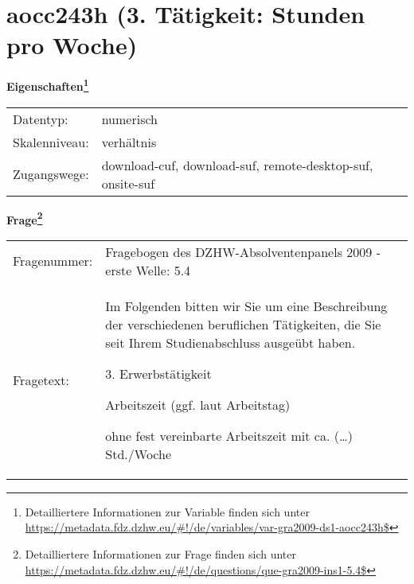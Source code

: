 
    \setcounter{footnote}{0}

    \vspace*{-1.8cm}
	\section{aocc243h (3. Tätigkeit: Stunden pro Woche)}
	\label{section:aocc243h}



    \vspace*{0.5cm}
    \noindent\textbf{Eigenschaften\footnote{Detailliertere Informationen zur Variable finden sich unter
		\url{https://metadata.fdz.dzhw.eu/\#!/de/variables/var-gra2009-ds1-aocc243h$}}}\\
	\begin{tabularx}{\hsize}{@{}lX}
	Datentyp: & numerisch \\
	Skalenniveau: & verhältnis \\
	Zugangswege: &
	  download-cuf, 
	  download-suf, 
	  remote-desktop-suf, 
	  onsite-suf
 \\
    \end{tabularx}



				\vspace*{0.5cm}
                \noindent\textbf{Frage\footnote{Detailliertere Informationen zur Frage finden sich unter
		              \url{https://metadata.fdz.dzhw.eu/\#!/de/questions/que-gra2009-ins1-5.4$}}}\\
				\begin{tabularx}{\hsize}{@{}lX}
					Fragenummer: &
					  Fragebogen des DZHW-Absolventenpanels 2009 - erste Welle:
					  5.4
 \\
					Fragetext: & Im Folgenden bitten wir Sie um eine Beschreibung der verschiedenen beruflichen Tätigkeiten, die Sie seit Ihrem Studienabschluss ausgeübt haben.\par  3. Erwerbstätigkeit\par  Arbeitszeit (ggf. laut Arbeitstag)\par  ohne fest vereinbarte Arbeitszeit mit ca. (…) Std./Woche \\
				\end{tabularx}





